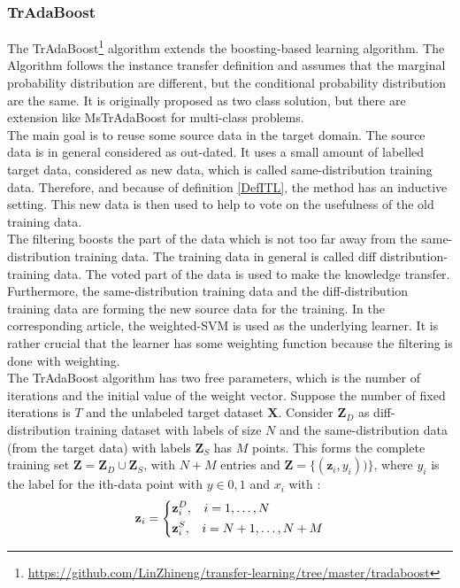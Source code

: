 \subsubsection{TrAdaBoost}
The TrAdaBoost\footnote{\url{https://github.com/LinZhineng/transfer-learning/tree/master/tradaboost}} algorithm extends the boosting-based learning algorithm.
The Algorithm follows the instance transfer definition and assumes that the marginal probability distribution are different, but the conditional probability distribution are the same.\cite{Dai.}
It is originally proposed as two class solution, but there are extension like MsTrAdaBoost for multi-class problems.\cite{Huang.2012}\\
The main goal is to reuse some source data in the target domain.
The source data is in general considered as out-dated.
It uses a small amount of labelled target data, considered as new data, which is called same-distribution training data.
Therefore, and because of definition \ref{DefITL}, the method has an inductive setting.
This new data is then used to help to vote on the usefulness of the old training data.\cite{Dai.}\\
The filtering boosts the part of the data which is not too far away from the same-distribution training data.
The training data in general is called diff distribution-training data.
The voted part of the data is used to make the knowledge transfer.
Furthermore, the same-distribution training data and the diff-distribution training data are forming the new source data for the training.
In the corresponding article, the weighted-\acs{SVM} is used as the underlying learner.
It is rather crucial that the learner has some weighting function because the filtering is done with weighting.\cite{Dai.}\\
The TrAdaBoost algorithm has two free parameters, which is the number of iterations and the initial value of the weight vector.
Suppose the number of fixed iterations is $T$ and the unlabeled target dataset $\mathbf{X}$.
Consider $\mathbf{Z}_D$ as diff-distribution training dataset with labels of size $N$ and the same-distribution data (from the target data) with labels $\mathbf{Z}_S$ has $M$ points.
This forms the complete training set $\mathbf{Z}=\mathbf{Z}_D\cup \mathbf{Z}_S$, with $N+M$ entries and $\mathbf{\mathbf{Z}}=\{(\mathbf{z}_i,y_i))\}$, where $y_i$ is the label for the ith-data point with $y\in {0,1}$ and $x_i$ with \cite{Dai.}:
\begin{equation*}
	\mathbf{z}_i = \begin{dcases}
						\mathbf{z}_i^D, \>\>\>\> i = 1,\dots,N\\
						\mathbf{z}_i^S, \>\>\>\> i = N +1,\dots,N+M
			  	   \end{dcases}
\end{equation*}
